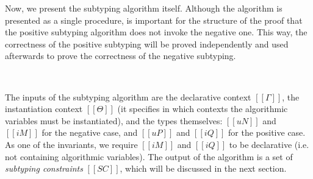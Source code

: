 Now, we present the subtyping algorithm itself.
Although the algorithm is presented as a single procedure,
is important for the structure of the proof that the positive subtyping algorithm
does not invoke the negative one. This way, the correctness of the positive 
subtyping will be proved independently and used afterwards to prove the
correctness of the negative subtyping.


\begin{algorithm}[Subtyping]
  \label{alg:subtyping}
  \hfill\\
  \ottdefnANsubLabeled[\apppref]{}
  \ottdefnAPsupLabeled[\apppref]{}
\end{algorithm}

The inputs of the subtyping algorithm are the declarative context $[[Γ]]$,
the instantiation context $[[Θ]]$ (it specifies in which contexts the algorithmic variables
must be instantiated), and the types themselves: $[[uN]]$ and $[[iM]]$ for the negative case,
and $[[uP]]$ and $[[iQ]]$ for the positive case. 
As one of the invariants, we require
$[[iM]]$ and $[[iQ]]$ to be declarative (i.e. not containing algorithmic variables).
The output of the algorithm is a set of \emph{subtyping constraints} $[[SC]]$,
which will be discussed in the next section.


